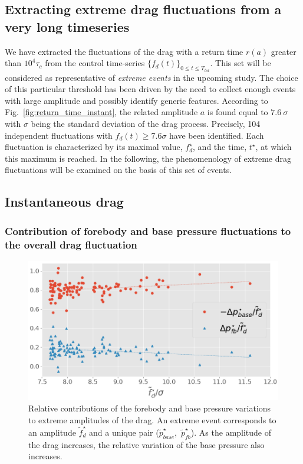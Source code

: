 \documentclass{jfm}
\begin{document}



\subsection{Extracting extreme drag fluctuations from a very long timeseries}
\label{sec:extreme_extraction}

%
We have extracted the fluctuations of the drag with a return time $r(a)$ greater than  $10^4\tau_c$ from the control time-series $\{f_d(t)\}_{0 \leq t \leq T_{tot}}$.
This set will be considered as representative of \emph{extreme events} in the upcoming study.
The choice of this particular threshold has been driven by the need to collect enough events with large amplitude and possibly identify generic features.
%
According to Fig.~\ref{fig:return_time_instant}, the related amplitude $a$ is found equal to $7.6~\sigma$ with $\sigma$ being the standard deviation of the drag process.
Precisely, 104 independent fluctuations with $f_d(t) \geq 7.6\sigma$ have been identified. Each fluctuation is characterized by its maximal value, $f_d^{\star}$, and the time, $t^{\star}$, at which this maximum is reached.
%
In the following, the phenomenology of extreme drag fluctuations will be examined on the basis of this set of events.

\subsection{Instantaneous drag}
\label{sec:instantaneous_drag}

\subsubsection{Contribution of forebody and base pressure fluctuations to the overall drag fluctuation}
\label{sec:forebody_and_base_contribution}

\begin{figure}
	\centering
	\includegraphics[width=.8\linewidth]{pressure_ratio/pressure_ratio.png}
	\caption{\label{fig:pressure_ratio} Relative contributions of the forebody and base pressure variations to extreme amplitudes of the drag. An extreme event corresponds to an amplitude $\tilde f^{\star}_d$ and a unique pair  ($\tilde{p}^{\star}_{base}$,~$\tilde{p}^{\star}_{fb}$).
	As the amplitude of the drag increases, the relative variation of the base pressure also increases. 
}
\end{figure}
\end{document}
